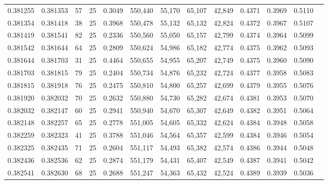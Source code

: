 \begin{tabular}{rrrrrrrrrrrrr}
0.381255 & 0.381353 &    57 &  25 &                                     0.3049 & 550,440 &  55,170 &  65,107 &  42,849 & 0.4371 & 0.3969 & 0.5110 \\
0.381354 & 0.381418 &    38 &  25 &                                     0.3968 & 550,478 &  55,132 &  65,132 &  42,824 & 0.4372 & 0.3967 & 0.5107 \\
0.381419 & 0.381541 &    82 &  25 &                                     0.2336 & 550,560 &  55,050 &  65,157 &  42,799 & 0.4374 & 0.3964 & 0.5099 \\
0.381542 & 0.381644 &    64 &  25 &                                     0.2809 & 550,624 &  54,986 &  65,182 &  42,774 & 0.4375 & 0.3962 & 0.5093 \\
0.381644 & 0.381703 &    31 &  25 &                                     0.4464 & 550,655 &  54,955 &  65,207 &  42,749 & 0.4375 & 0.3960 & 0.5090 \\
0.381703 & 0.381815 &    79 &  25 &                                     0.2404 & 550,734 &  54,876 &  65,232 &  42,724 & 0.4377 & 0.3958 & 0.5083 \\
0.381815 & 0.381918 &    76 &  25 &                                     0.2475 & 550,810 &  54,800 &  65,257 &  42,699 & 0.4379 & 0.3955 & 0.5076 \\
0.381920 & 0.382032 &    70 &  25 &                                     0.2632 & 550,880 &  54,730 &  65,282 &  42,674 & 0.4381 & 0.3953 & 0.5070 \\
0.382032 & 0.382147 &    60 &  25 &                                     0.2941 & 550,940 &  54,670 &  65,307 &  42,649 & 0.4382 & 0.3951 & 0.5064 \\
0.382148 & 0.382257 &    65 &  25 &                                     0.2778 & 551,005 &  54,605 &  65,332 &  42,624 & 0.4384 & 0.3948 & 0.5058 \\
0.382259 & 0.382323 &    41 &  25 &                                     0.3788 & 551,046 &  54,564 &  65,357 &  42,599 & 0.4384 & 0.3946 & 0.5054 \\
0.382325 & 0.382435 &    71 &  25 &                                     0.2604 & 551,117 &  54,493 &  65,382 &  42,574 & 0.4386 & 0.3944 & 0.5048 \\
0.382436 & 0.382536 &    62 &  25 &                                     0.2874 & 551,179 &  54,431 &  65,407 &  42,549 & 0.4387 & 0.3941 & 0.5042 \\
0.382541 & 0.382630 &    68 &  25 &                                     0.2688 & 551,247 &  54,363 &  65,432 &  42,524 & 0.4389 & 0.3939 & 0.5036 \\

\end{tabular}

